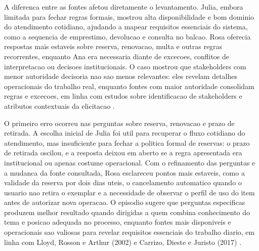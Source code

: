 ﻿\documentclass[12pt]{article}
\begin{document}
%
A diferenca entre as fontes afetou diretamente o levantamento. Julia, embora limitada para fechar regras formais, mostrou alta disponibilidade e bom dominio do atendimento cotidiano, ajudando a mapear requisitos essenciais do sistema, como a sequencia de emprestimo, devolucao e consulta no balcao. Rosa oferecia respostas mais estaveis sobre reserva, renovacao, multa e outras regras recorrentes, enquanto Ana era necessaria diante de excecoes, conflitos de interpretacao ou decisoes institucionais. O caso mostrou que stakeholders com menor autoridade decisoria nao sao menos relevantes: eles revelam detalhes operacionais do trabalho real, enquanto fontes com maior autoridade consolidam regras e excecoes, em linha com estudos sobre identificacao de stakeholders e atributos contextuais da elicitacao \cite{sharp1999stakeholder,carrizo2017context}.

%
%
O primeiro erro ocorreu nas perguntas sobre reserva, renovacao e prazo de retirada. A escolha inicial de Julia foi util para recuperar o fluxo cotidiano do atendimento, mas insuficiente para fechar a politica formal de reservas: o prazo de retirada oscilou, e a resposta deixou em aberto se a regra apresentada era institucional ou apenas costume operacional. Com o refinamento das perguntas e a mudanca da fonte consultada, Rosa esclareceu pontos mais estaveis, como a validade da reserva por dois dias uteis, o cancelamento automatico quando o usuario nao retira o exemplar e a necessidade de observar o perfil de uso do item antes de autorizar nova operacao. O episodio sugere que perguntas especificas produzem melhor resultado quando dirigidas a quem combina conhecimento do tema e posicao adequada no processo, enquanto fontes mais disponiveis e operacionais sao valiosas para revelar requisitos essenciais do trabalho diario, em linha com Lloyd, Rosson e Arthur (2002) e Carrizo, Dieste e Juristo (2017) \cite{lloyd2002distributed,carrizo2017context}.
\end{document}
